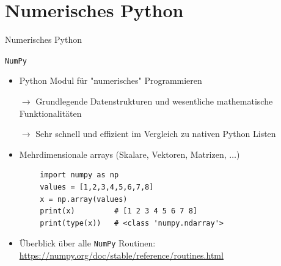 \documentclass[utf8, smaller, c]{beamer}
\renewcommand{\tt}[1]{{\texttt{#1}}}
\begin{document}
\section{Numerisches Python}
\begin{frame}{Numerisches Python}
    \begin{block}{\tt{NumPy}}
        \begin{itemize}
            \item Python Modul für "numerisches" Programmieren
            \item[$\rightarrow$] Grundlegende Datenstrukturen und wesentliche mathematische Funktionalitäten
            \item[$\rightarrow$] Sehr schnell und effizient im Vergleich zu nativen Python Listen
            \item Mehrdimensionale arrays (Skalare, Vektoren, Matrizen, $\dots$)
        \end{itemize}
        \begin{lstlisting}
        import numpy as np
        values = [1,2,3,4,5,6,7,8]
        x = np.array(values)
        print(x)         # [1 2 3 4 5 6 7 8]
        print(type(x))   # <class 'numpy.ndarray'>
        \end{lstlisting}
        \begin{itemize}
            \item Überblick über alle \tt{NumPy} Routinen:\\ {\footnotesize\url{https://numpy.org/doc/stable/reference/routines.html}}
        \end{itemize}
    \end{block}
    
    \pagebreak
    

\end{frame}
\end{document}
